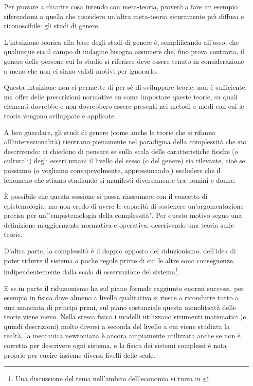 \documentclass[a4paper, headings=standardclasses]{scrartcl}
\begin{document}
Per provare a chiarire cosa intendo con meta-teoria, proverò a fare un esempio riferendomi a quella che considero un'altra meta-teoria sicuramente più diffusa e riconoscibile: gli studi di genere.

L'intuizione teorica alla base degli studi di genere è, semplificando all'osso, che qualunque sia il campo di indagine bisogna assumere che, fino prova contraria, il genere delle persone cui lo studio si riferisce deve essere tenuto in considerazione a meno che non ci siano validi motivi per ignorarlo.

Questa intuizione non ci permette di per sè di sviluppare teorie, non è sufficiente, ma offre delle prescrizioni normative su come impostare queste teorie, su quali elementi dovrebbe e non dovrebbero essere presenti nei metodi e modi con cui le teorie vengono sviluppate e applicate.

A ben guardare, gli studi di genere (come anche le teorie che si rifanno all'intersezionalità) rientrano pienamente nel paradigma della complessità che sto descrivendo: ci chiedono di pensare se sulla scala delle caratteristiche fisiche (o culturali) degli esseri umani il livello del sesso (o del genere) sia rilevante, cioè se possiamo (o vogliamo consapevolmente, approssimando,) escludere che il fenomeno che stiamo studiando si manifesti diversamente tra uomini e donne.

È possibile che questa sessione si possa riassumere con il concetto di epistemologia, ma non credo di avere le capacità di sostenere un'argomentazione precisa per un'"empistemologia della complessità". Per questo motivo seguo una definizione maggiormente normativa e operativa, descrivendo una teoria sulle teorie.

D'altra parte, la complessità è il doppio opposto del riduzionismo, dell'idea di poter ridurre il sistema a poche regole prime di cui le altre sono conseguenze, indipendentemente dalla scala di osservazione del sistema\footnote{Una discussione del tema nell'ambito dell'economia si trova in \textcite{fontana2010}}.

E se in parte il riduzionismo ha sul piano formale raggiunto enormi successi, per esempio in fisica dove almeno a livello qualitativo si riesce a ricondurre tutto a una manciata di principi primi, sul piano sostanziale questa monoliticità delle teorie viene meno.
Nella stessa fisica i modelli utilizzano strumenti matematici (e quindi descrizioni) molto diversi a seconda del livello a cui viene studiata la realtà, la meccanica newtoniana è ancora ampiamente utilizzata anche se non è corretta per descrivere ogni sistema, e la fisica dei sistemi complessi è nata proprio per cucire insieme diversi livelli delle scale.
\end{document}
